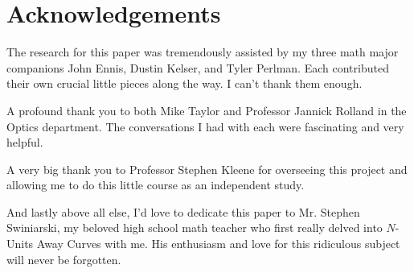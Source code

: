 \section{Acknowledgements}

The research for this paper was tremendously assisted by my three math major companions John Ennis, Dustin Kelser, and Tyler Perlman. Each contributed their own crucial little pieces along the way. I can’t thank them enough.

A profound thank you to both Mike Taylor and Professor Jannick Rolland in the Optics department. The conversations I had with each were fascinating and very helpful.

A very big thank you to Professor Stephen Kleene for overseeing this project and allowing me to do this little course as an independent study.

And lastly above all else, I’d love to dedicate this paper to Mr. Stephen Swiniarski, my beloved high school math teacher who first really delved into $N$-Units Away Curves with me. His enthusiasm and love for this ridiculous subject will never be forgotten.
